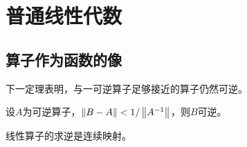 \documentclass{ctexrep}
\begin{document}
\fi


\chapter{普通线性代数}
  \section{算子作为函数的像}
  下一定理表明，与一可逆算子足够接近的算子仍然可逆。
  \begin{theorem}
    \label{thm:opr-0}
    设$A$为可逆算子，$\left\| B-A \right\|<1/\left\| A^{-1} \right\|$，则$B$可逆。
  \end{theorem}
  \begin{theorem}
    \label{thm:opr-1}
    线性算子的求逆是连续映射。
  \end{theorem}

 
\ifx\allfiles\undefined %
\end{document}
